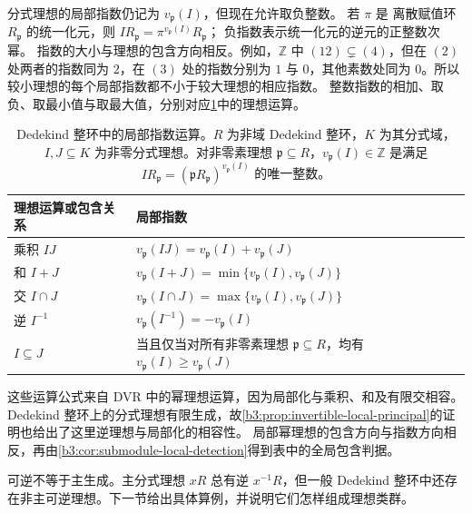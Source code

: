 分式理想的局部指数仍记为 \(v_{\mathfrak p}(I)\)，但现在允许取负整数。 若 \(\pi\) 是 离散赋值环 \(R_{\mathfrak p}\) 的统一化元，则 \(IR_{\mathfrak p}=\pi^{v_{\mathfrak p}(I)}R_{\mathfrak p}\)； 负指数表示统一化元的逆元的正整数次幂。 指数的大小与理想的包含方向相反。例如，\(\mathbb Z\) 中 \((12)\subsetneq(4)\)，但在 \((2)\) 处两者的指数同为 \(2\)，在 \((3)\) 处的指数分别为 \(1\) 与 \(0\)，其他素数处同为 \(0\)。所以较小理想的每个局部指数都不小于较大理想的相应指数。 整数指数的相加、取负、取最小值与取最大值，分别对应\cref{b3:tab:dedekind-ideal-exponents}中的理想运算。

\begin{table}[htbp]
	\centering
	\caption[Dedekind 整环中的局部指数运算]{Dedekind 整环中的局部指数运算。\(R\) 为非域 Dedekind 整环，\(K\) 为其分式域，\(I,J\subseteq K\) 为非零分式理想。对非零素理想 \(\mathfrak p\subseteq R\)，\(v_{\mathfrak p}(I)\in\mathbb Z\) 是满足 \(IR_{\mathfrak p}=(\mathfrak pR_{\mathfrak p})^{v_{\mathfrak p}(I)}\) 的唯一整数。}
	\label{b3:tab:dedekind-ideal-exponents}
	\begin{tabularx}{\textwidth}{@{}p{}X@{}}
		\toprule
		理想运算或包含关系 & 局部指数\\
		\midrule
		乘积 \(IJ\) & \(v_{\mathfrak p}(IJ)=v_{\mathfrak p}(I)+v_{\mathfrak p}(J)\)\\
		和 \(I+J\) & \(v_{\mathfrak p}(I+J)=\min\{v_{\mathfrak p}(I),v_{\mathfrak p}(J)\}\)\\
		交 \(I\cap J\) & \(v_{\mathfrak p}(I\cap J)=\max\{v_{\mathfrak p}(I),v_{\mathfrak p}(J)\}\)\\
		逆 \(I^{-1}\) & \(v_{\mathfrak p}(I^{-1})=-v_{\mathfrak p}(I)\)\\
		\(I\subseteq J\) & 当且仅当对所有非零素理想 \(\mathfrak p\subseteq R\)，均有 \(v_{\mathfrak p}(I)\ge v_{\mathfrak p}(J)\)\\
		\bottomrule
	\end{tabularx}
\end{table}

这些运算公式来自 DVR 中的幂理想运算，因为局部化与乘积、和及有限交相容。 Dedekind 整环上的分式理想有限生成，故\cref{b3:prop:invertible-local-principal}的证明也给出了这里逆理想与局部化的相容性。 局部幂理想的包含方向与指数方向相反，再由\cref{b3:cor:submodule-local-detection}得到表中的全局包含判据。

可逆不等于主生成。主分式理想 \(xR\) 总有逆 \(x^{-1}R\)，但一般 Dedekind 整环中还存在非主可逆理想。下一节给出具体算例，并说明它们怎样组成理想类群。
